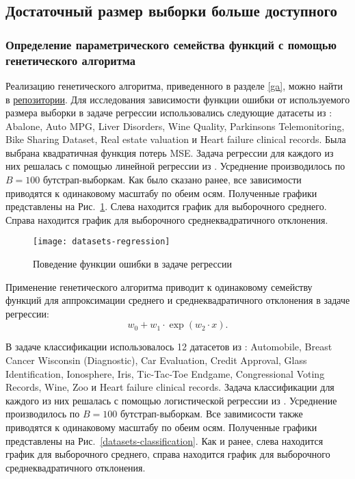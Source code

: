 \clearpage
\subsection{Достаточный размер выборки больше доступного}

\subsubsection{Определение параметрического семейства функций с помощью генетического алгоритма}

Реализацию генетического алгоритма, приведенного в разделе \ref{ga}, можно найти в \href{https://github.com/kisnikser/Likelihood-Bootstrapping/tree/main/code/genetic_algorithm}{репозитории}. Для исследования зависимости функции ошибки от используемого размера выборки в задаче регрессии использовались следующие датасеты из \citep{UCI}: Abalone, Auto MPG, Liver Disorders, Wine Quality, Parkinsons Telemonitoring, Bike Sharing Dataset, Real estate valuation и Heart failure clinical records. Была выбрана квадратичная функция потерь MSE. Задача регрессии для каждого из них решалась с помощью линейной регрессии из \citep{scikit-learn}. Усреднение производилось по $B = 100$ бутстрап-выборкам. Как было сказано ранее, все зависимости приводятся к одинаковому масштабу по обеим осям. Полученные графики представлены на Рис.~\ref{datasets-regression}. Слева находится график для выборочного среднего. Справа находится график для выборочного среднеквадратичного отклонения.

\begin{figure}[h!]
    \centering
    \texttt{[image: datasets-regression]}
    \caption{Поведение функции ошибки в задаче регрессии}
    \label{datasets-regression}
\end{figure}

Применение генетического алгоритма приводит к одинаковому семейству функций для аппроксимации среднего и среднеквадратичного отклонения в задаче регрессии:
\[ w_0 + w_1 \cdot \exp(w_2 \cdot x). \]

В задаче классификации использовалось 12 датасетов из \citep{UCI}: Automobile, Breast Cancer Wisconsin (Diagnostic), Car Evaluation, Credit Approval, Glass Identification, Ionosphere, Iris, Tic-Tac-Toe Endgame, Congressional Voting Records, Wine, Zoo и Heart failure clinical records. Задача классификации для каждого из них решалась с помощью логистической регрессии из \citep{scikit-learn}. Усреднение производилось по $B = 100$ бутстрап-выборкам. Все завимисости также приводятся к одинаковому масштабу по обеим осям. Полученные графики представлены на Рис.~\ref{datasets-classification}. Как и ранее, слева находится график для выборочного среднего, справа находится график для выборочного среднеквадратичного отклонения.

